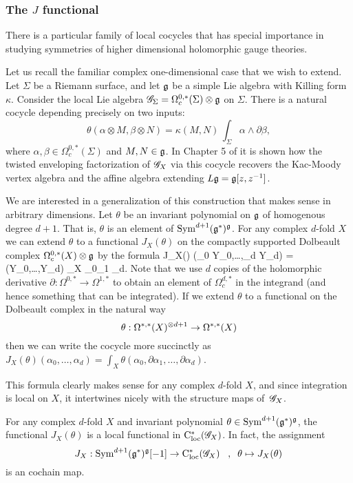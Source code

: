 \documentclass[10pt]{amsart}
\begin{document}
\subsubsection{The $J$ functional} \label{sec: g j functional}

There is a particular family of local cocycles that has special importance in studying symmetries of higher dimensional holomorphic gauge theories. 

Let us recall the familiar complex one-dimensional case that we wish to extend. 
Let $\Sigma$ be a Riemann surface, and let $\mathfrak g$ be a simple Lie algebra with Killing form $\kappa$.
Consider the local Lie algebra $\mathscr G_\Sigma = \Omega^{0,*}_c(\Sigma) \otimes \mathfrak g$ on $\Sigma$.
There is a natural cocycle depending precisely on two inputs:
\[
\theta( \alpha \otimes M, \beta \otimes N) = \kappa(M,N) \, \int_\Sigma \alpha \wedge \partial \beta  ,
\]
where $\alpha, \beta \in \Omega^{0,*}_c(\Sigma)$ and $M,N \in \mathfrak g$.
In Chapter 5 of \cite{CG1} it is shown how the twisted enveloping factorization of $\mathscr G_X$ via this cocycle recovers the Kac-Moody vertex algebra and the affine algebra extending $L\mathfrak g = \mathfrak g[z,z^{-1}]$.

We are interested in a generalization of this construction that makes sense in arbitrary dimensions.
Let $\theta$ be an invariant polynomial on $\mathfrak g$ of homogenous degree $d+1$. 
That is, $\theta$ is an element of ${\rm Sym}^{d+1}(\mathfrak g^*)^\mathfrak g$. 
For any complex $d$-fold $X$ we can extend $\theta$ to a functional $J_X(\theta)$ on the compactly supported Dolbeault complex $\Omega^{0,*}_c(X) \otimes \mathfrak g$ by the formula
\beqn\label{j g formula}
J_X(\theta) (\omega_0 \tensor Y_0,\ldots,\omega_{d} \tensor Y_{d}) = \theta(Y_0,\ldots,Y_{d}) \int_X \omega_0\wedge \partial \omega_1 \cdots \wedge \partial \omega_{d}.
\eeqn
Note that we use $d$ copies of the holomorphic derivative $\partial: \Omega^{0,*} \to \Omega^{1,*}$ to obtain an element of $\Omega^{d,*}_c$ in the integrand (and hence something that can be integrated).
If we extend $\theta$ to a functional on the Dolbeault complex in the natural way
\[
\theta : \Omega^{*,*}(X)^{\otimes d+1} \to \Omega^{*,*}(X)
\]
then we can write the cocycle more succinctly as $J_X(\theta)(\alpha_0 ,\ldots,\alpha_d) = \int_X \theta(\alpha_0,\partial \alpha_1,\ldots,\partial \alpha_d)$. 

This formula clearly makes sense for any complex $d$-fold $X$, 
and since integration is local on $X$, 
it intertwines nicely with the structure maps of~$\mathscr G_X$.

\begin{prop}\label{prop j map} 
For any complex $d$-fold $X$ and invariant polynomial $\theta \in {\rm Sym}^{d+1}(\mathfrak g^*)^\mathfrak g$, the functional $J_X(\theta)$ is a local functional in ${\rm C}_{\rm loc}^*(\mathscr G_X)$. 
In fact, the assignment 
\[
J_X : {\rm Sym}^{d+1} (\mathfrak g^*)^\mathfrak g [-1] \to {\rm C}_{\rm loc}^*(\mathscr G_X) \;\;\; , \;\; \theta \mapsto J_X(\theta)
\]
is an cochain map.
\end{prop}
\end{document}
